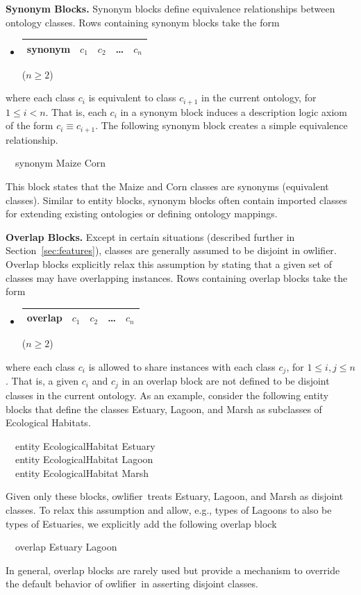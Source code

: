 \documentclass[5p,authoryear]{elsarticle}
\newcommand{\owlifier}{\textsf{owlifier}}
\newcommand{\myblock}[1]{\vspace{12pt}\noindent\textbf{#1}}
\newcommand{\secref}[1]{Section~\ref{#1}}
\begin{document}
\myblock{Synonym Blocks.} Synonym blocks define equivalence
relationships between ontology classes.  Rows containing synonym
blocks take the form
\begin{itemize}
\item[] 
  \begin{tabular}{|l|l|l|l|l|}\hline
    \textsf{synonym} & $c_1$ & $c_2$ & \dots & $c_n$ \\ \hline 
  \end{tabular} \hfill ($n \ge 2$)
\end{itemize}
where each class $c_i$ is equivalent to class $c_{i+1}$ in the current
ontology, for $1 \le i < n$. That is, each $c_i$ in a synonym block
induces a description logic axiom of the form $c_i \equiv
c_{i+1}$. The following synonym block creates a simple equivalence
relationship.
\begin{tabbing}
  ~~\textsf{synonym} \textsf{Maize} \textsf{Corn}
\end{tabbing}
This block states that the Maize and Corn classes are synonyms
(equivalent classes). Similar to entity blocks, synonym blocks often
contain imported classes for extending existing ontologies or defining
ontology mappings.


\myblock{Overlap Blocks.} Except in certain situations (described
further in \secref{sec:features}), classes are generally
assumed to be disjoint in \owlifier.  Overlap blocks explicitly relax
this assumption by stating that a given set of classes may have
overlapping instances. Rows containing overlap blocks take the form
\begin{itemize}
\item[] 
  \begin{tabular}{|l|l|l|l|l|}\hline
    \textsf{overlap} & $c_1$ & $c_2$ & \dots & $c_n$ \\ \hline 
  \end{tabular} \hfill ($n \ge 2$)
\end{itemize}
where each class $c_i$ is allowed to share instances with each class
$c_j$, for $1 \le i,j \le n$. That is, a given $c_i$ and $c_j$ in an
overlap block are not defined to be disjoint classes in the current
ontology. As an example, consider the following entity blocks that
define the classes Estuary, Lagoon, and Marsh as subclasses of
Ecological Habitats.
\begin{tabbing}
  ~~\textsf{entity} \textsf{EcologicalHabitat} \textsf{Estuary} \\ 
  ~~\textsf{entity} \textsf{EcologicalHabitat} \textsf{Lagoon} \\ 
  ~~\textsf{entity} \textsf{EcologicalHabitat} \textsf{Marsh} 
\end{tabbing}
Given only these blocks, \owlifier\ treats Estuary, Lagoon, and Marsh
as disjoint classes. To relax this assumption and allow, e.g., types
of Lagoons to also be types of Estuaries, we explicitly add the
following overlap block
\begin{tabbing}
  ~~\textsf{overlap} \textsf{Estuary} \textsf{Lagoon}
\end{tabbing}
In general, overlap blocks are rarely used but provide a mechanism to
override the default behavior of \owlifier\ in asserting disjoint
classes.
\end{document}
